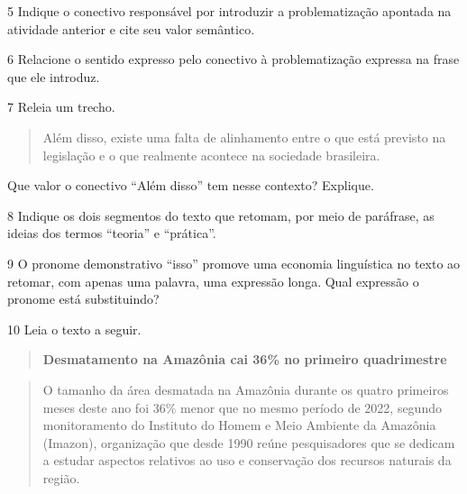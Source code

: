 \num{5} Indique o conectivo responsável por introduzir a problematização
apontada na atividade anterior e cite seu valor semântico.


\num{6} Relacione o sentido expresso pelo conectivo à problematização
expressa na frase que ele introduz.


\num{7} Releia um trecho.

\begin{quote}
Além disso, existe uma falta de alinhamento entre o que está previsto na
legislação e o que realmente acontece na sociedade brasileira.
\end{quote}

Que valor o conectivo ``Além disso'' tem nesse contexto? Explique.


\num{8} Indique os dois segmentos do texto que retomam, por meio de
paráfrase, as ideias dos termos ``teoria'' e ``prática''.


\num{9} O pronome demonstrativo ``isso'' promove uma economia
linguística no texto ao retomar, com apenas uma palavra, uma expressão
longa. Qual expressão o pronome está substituindo?


\num{10} Leia o texto a seguir.

\begin{quote}
\textbf{Desmatamento na Amazônia cai 36\% no primeiro quadrimestre}
\end{quote}

\begin{quote}
O tamanho da área desmatada na Amazônia durante os quatro primeiros
meses deste ano foi 36\% menor que no mesmo período de 2022, segundo
monitoramento do Instituto do Homem e Meio Ambiente da Amazônia
(Imazon), organização que desde 1990 reúne pesquisadores que se dedicam
a estudar aspectos relativos ao uso e conservação dos recursos naturais
da região.
\end{quote}

